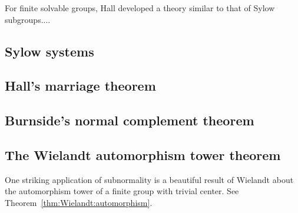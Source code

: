 For finite solvable groups, Hall developed a theory similar to that of Sylow subgroups....

\subsection*{Sylow systems}

\subsection*{Hall's marriage theorem}

\subsection*{Burnside's normal complement theorem}

\subsection*{The Wielandt automorphism tower theorem}

One striking application of subnormality is a beautiful result 
of Wielandt about the automorphism tower of a finite group with trivial center. See 
Theorem~\ref{thm:Wielandt:automorphism}.